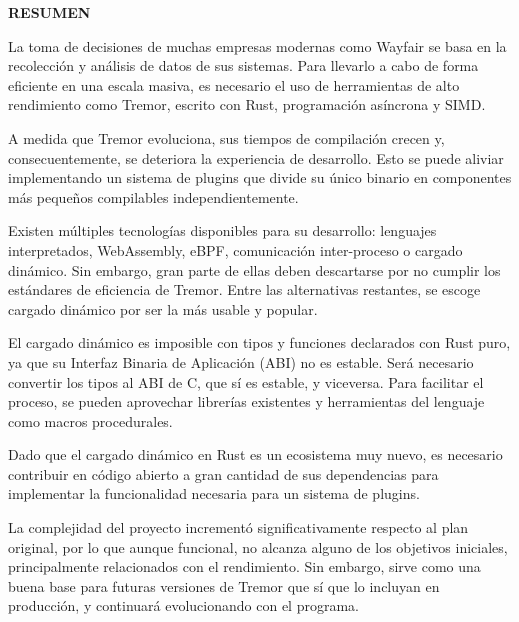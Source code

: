 
\begin{center}
{\LARGE \bfseries RESUMEN}

\vspace{2.5cm}
\end{center}

La toma de decisiones de muchas empresas modernas como Wayfair se basa en la
recolección y análisis de datos de sus sistemas. Para llevarlo a cabo de forma
eficiente en una escala masiva, es necesario el uso de herramientas de alto
rendimiento como Tremor, escrito con Rust, programación asíncrona y SIMD.

A medida que Tremor evoluciona, sus tiempos de compilación crecen y,
consecuentemente, se deteriora la experiencia de desarrollo. Esto se puede
aliviar implementando un sistema de plugins que divide su único binario en
componentes más pequeños compilables independientemente.

Existen múltiples tecnologías disponibles para su desarrollo: lenguajes
interpretados, WebAssembly, eBPF, comunicación inter-proceso o cargado dinámico.
Sin embargo, gran parte de ellas deben descartarse por no cumplir los estándares
de eficiencia de Tremor. Entre las alternativas restantes, se escoge cargado
dinámico por ser la más usable y popular.

El cargado dinámico es imposible con tipos y funciones declarados con Rust puro,
ya que su Interfaz Binaria de Aplicación (ABI) no es estable. Será necesario
convertir los tipos al ABI de C, que sí es estable, y viceversa. Para facilitar
el proceso, se pueden aprovechar librerías existentes y herramientas del
lenguaje como macros procedurales.

Dado que el cargado dinámico en Rust es un ecosistema muy nuevo, es necesario
contribuir en código abierto a gran cantidad de sus dependencias para
implementar la funcionalidad necesaria para un sistema de plugins.

La complejidad del proyecto incrementó significativamente respecto al plan
original, por lo que aunque funcional, no alcanza alguno de los objetivos
iniciales, principalmente relacionados con el rendimiento. Sin embargo, sirve
como una buena base para futuras versiones de Tremor que sí que lo incluyan en
producción, y continuará evolucionando con el programa.
